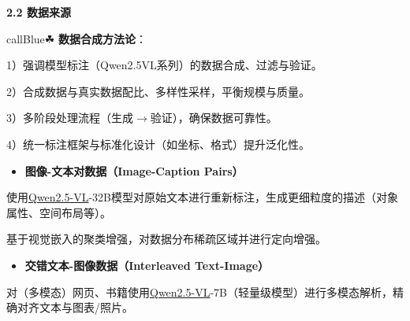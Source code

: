 \documentclass[zihao=false,fontset=windows]{ctexart}
\begin{document}
\Needspace{2cm}\par\vspace{0.9em}\begin{tcolorbox}[enhanced,colback=headOrange,boxrule=0pt,arc=4pt,boxsep=0pt,left=3pt,right=3pt,top=2pt,bottom=2pt,before skip=0pt,after skip=3pt]\bfseries \textcolor{feishuBlue}{2.2} 数据来源\end{tcolorbox}

\begin{feishubox}{callBlue}{☘}
\textbf{数据合成方法论}：\par

1）强调模型标注（Qwen2.5VL系列）的数据合成、过滤与验证。\par

2）合成数据与真实数据配比、多样性采样，平衡规模与质量。\par

3）多阶段处理流程（生成$\rightarrow$验证），确保数据可靠性。\par

4）统一标注框架与标准化设计（如坐标、格式）提升泛化性。\par

\end{feishubox}

\begin{itemize}[label=\textcolor{feishuBlue}{\textbullet}]
\item \textbf{图像-文本对数据（Image-Caption Pairs）}

\end{itemize}

使用\href{https://scnajei2ds6y.feishu.cn/wiki/S7Q2wviQhiYtQFk4jKvccQwDnWe}{Qwen2.5-VL}-32B模型对原始文本进行重新标注，生成更细粒度的描述（对象属性、空间布局等）。\par

基于视觉嵌入的聚类增强，对数据分布稀疏区域并进行定向增强。\par

\begin{itemize}[label=\textcolor{feishuBlue}{\textbullet}]
\item \textbf{交错文本-图像数据（Interleaved Text-Image）}

\end{itemize}

对（多模态）网页、书籍使用\href{https://scnajei2ds6y.feishu.cn/wiki/S7Q2wviQhiYtQFk4jKvccQwDnWe}{Qwen2.5-VL}-7B（轻量级模型）进行多模态解析，精确对齐文本与图表/照片。\par
\end{document}
